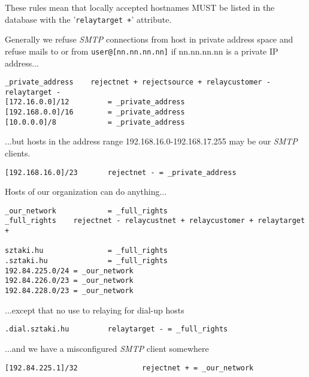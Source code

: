 These rules mean that locally accepted hostnames MUST be listed in
the database with the '{\tt relaytarget +}' attribute.

Generally we refuse {\em SMTP\/} connections from host in private address space
and refuse mails to or from {\tt user@[nn.nn.nn.nn]} if nn.nn.nn.nn is a
private IP address...

\begin{tscreen}
\begin{verbatim}
_private_address    rejectnet + rejectsource + relaycustomer - relaytarget -
[172.16.0.0]/12         = _private_address
[192.168.0.0]/16        = _private_address
[10.0.0.0]/8            = _private_address
\end{verbatim}
\end{tscreen}


...but hosts in the address range 192.168.16.0-192.168.17.255 may be
our {\em SMTP\/} clients.

\begin{tscreen}
\begin{verbatim}
[192.168.16.0]/23       rejectnet - = _private_address
\end{verbatim}
\end{tscreen}


Hosts of our organization can do anything...

\begin{tscreen}
\begin{verbatim}
_our_network            = _full_rights
_full_rights    rejectnet - relaycustnet + relaycustomer + relaytarget +

sztaki.hu               = _full_rights
.sztaki.hu              = _full_rights
192.84.225.0/24 = _our_network
192.84.226.0/23 = _our_network
192.84.228.0/23 = _our_network
\end{verbatim}
\end{tscreen}


...except that no use to relaying for dial-up hosts

\begin{tscreen}
\begin{verbatim}
.dial.sztaki.hu         relaytarget - = _full_rights
\end{verbatim}
\end{tscreen}


...and we have a misconfigured {\em SMTP\/} client somewhere

\begin{tscreen}
\begin{verbatim}
[192.84.225.1]/32               rejectnet + = _our_network
\end{verbatim}
\end{tscreen}


